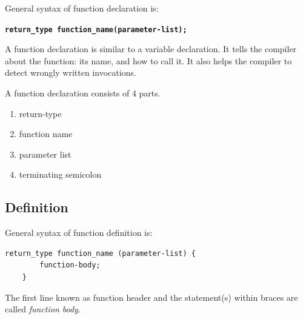 \documentclass[11pt,a4paper]{article}
\begin{document}
General syntax of function declaration is: 

\textbf{\texttt{return\_type function\_name(parameter-list);}}

A function declaration is similar to a variable declaration. It tells the compiler about the function: its name, and how to call it. It also helps the compiler to detect wrongly written invocations. 

A function declaration consists of 4 parts.
\begin{enumerate}
\item return-type
\item function name
\item parameter list
\item terminating semicolon
\end{enumerate}

\subsection*{Definition} 

General syntax of function definition is:

\begin{lstlisting}[numbers=none]
    return_type function_name (parameter-list) {   
        function-body;
    }
\end{lstlisting}

The first line  known as function header and the statement(s) within braces are called \emph{function body}.
\end{document}

